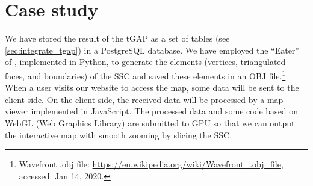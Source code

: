 \documentclass[]{interact}
\begin{document}
%
%
%
%
%
%
%
%


\section{Case study}
\label{sec:case_study}

We have stored the result of the tGAP 
as a set of tables (see \sect\ref{sec:integrate_tgap}) 
in a PostgreSQL database.
We have employed the ``Eater'' of \citet{Suba2014Merge},
implemented in Python, 
to generate the elements
(vertices, triangulated faces, and boundaries)
of the SSC \citep{vanOosterom2014tGAPSSC} 
and saved these elements in an OBJ file.\footnote{%
Wavefront .obj file:
\url{https://en.wikipedia.org/wiki/Wavefront_.obj_file},
accessed: Jan 14, 2020.}
%
When a user visits our website to access the map,
some data will be sent to the client side.  
On the client side,
the received data will be processed
by a map viewer implemented in JavaScript.
The processed data and some code based on WebGL (Web Graphics Library)
are submitted to GPU so that we can output the interactive map with smooth zooming
by slicing the SSC.
\end{document}

